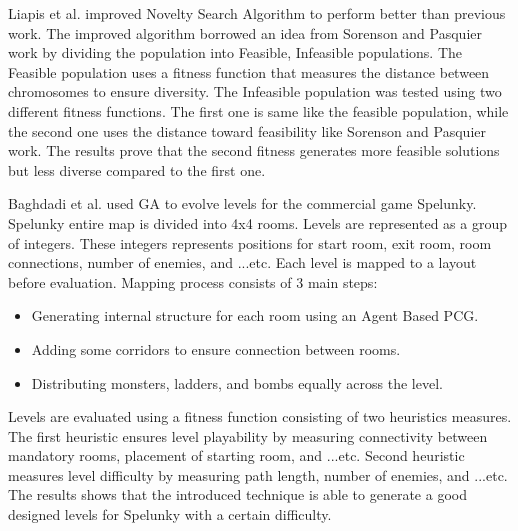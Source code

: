 Liapis et al.\cite{noveltySearch} improved Novelty Search Algorithm to perform better than previous work\cite{goodDiverseLevels}. The improved algorithm borrowed an idea from Sorenson and Pasquier work\cite{genericLevelFramework} by dividing the population into Feasible, Infeasible populations. The Feasible population uses a fitness function that measures the distance between chromosomes to ensure diversity. The Infeasible population was tested using two different fitness functions. The first one is same like the feasible population, while the second one uses the distance toward feasibility like Sorenson and Pasquier work\cite{genericLevelFramework}. The results prove that the second fitness generates more feasible solutions but less diverse compared to the first one.\\\par

Baghdadi et al.\cite{spelunkyLevelGeneration} used GA to evolve levels for the commercial game Spelunky\cite{spelunky}. Spelunky entire map is divided into 4x4 rooms. Levels are represented as a group of integers. These integers represents positions for start room, exit room, room connections, number of enemies, and ...etc. Each level is mapped to a layout before evaluation. Mapping process consists of 3 main steps:
\begin{itemize} \itemsep0pt \parskip0pt 
	\item Generating internal structure for each room using an Agent Based PCG.
	\item Adding some corridors to ensure connection between rooms.
	\item Distributing monsters, ladders, and bombs equally across the level.
\end{itemize}
Levels are evaluated using a fitness function consisting of two heuristics measures. The first heuristic ensures level playability by measuring connectivity between mandatory rooms, placement of starting room, and ...etc. Second heuristic measures level difficulty by measuring path length, number of enemies, and ...etc. The results shows that the introduced technique is able to generate a good designed levels for Spelunky with a certain difficulty.\\\par

